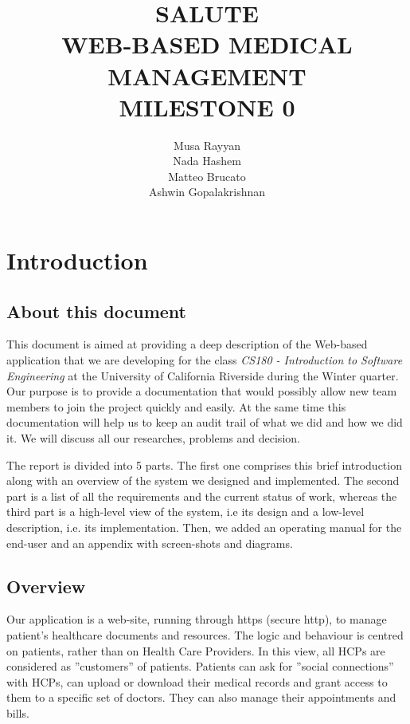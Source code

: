 \documentclass[10pt]{report}
\title{SALUTE \\ WEB-BASED MEDICAL MANAGEMENT \\ MILESTONE 0}
\author{Musa Rayyan \\ Nada Hashem \\ Matteo Brucato \\ Ashwin Gopalakrishnan}
\begin{document}
\maketitle
\tableofcontents

\part{Introduction}

\chapter{About this document}

This document is aimed at providing a deep description of the Web-based application that we are developing for the class \emph{CS180 - Introduction to Software Engineering} at the University of California Riverside during the Winter quarter. Our purpose is to provide a documentation that would possibly allow new team members to join the project quickly and easily. At the same time this documentation will help us to keep an audit trail of what we did and how we did it. We will discuss all our researches, problems and decision.

The report is divided into 5 parts. The first one comprises this brief introduction along with an overview of the system we designed and implemented. The second part is a list of all the requirements and the current status of work, whereas the third part is a high-level view of the system, i.e its design and a low-level description, i.e. its implementation. Then, we added an operating manual for the end-user and an appendix with screen-shots and diagrams.

\chapter{Overview}
Our application is a web-site, running through https (secure http), to manage patient's healthcare documents and resources. The logic and behaviour is centred on patients, rather than on Health Care Providers. In this view, all HCPs are considered as ''customers'' of patients. Patients can ask for ''social connections'' with HCPs, can upload or download their medical records and grant access to them to a specific set of doctors. They can also manage their appointments and bills.
\end{document}
